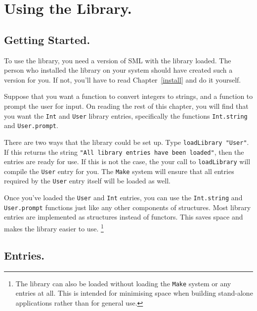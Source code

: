 %
%
%

\chapter{Using the Library.}	\label{user}

\section{Getting Started.}

To use the library, you need a version of SML with the library loaded.
The person who installed the library on your system should have created
such a version for you.  If not, you'll have to read Chapter~\ref{install}
and do it yourself.

Suppose that you want a function to convert integers to strings,
and a function to prompt the user for input.  On reading the rest of this
chapter, you will find that you want the {\tt Int} and {\tt User} library
entries, specifically the functions {\tt Int.string} and
{\tt User.prompt}.

There are two ways that the library could be set up.
Type {\tt loadLibrary "User"}.  If this returns the
string {\tt "All library entries have been loaded"},
then the entries are ready for use.  If this is not the case, the
your call to {\tt loadLibrary} will compile the {\tt User} entry for you.
The {\tt Make} system will ensure that all entries required by the
{\tt User} entry itself will be loaded as well.

Once you've loaded the {\tt User} and {\tt Int} entries, you can use
the {\tt Int.string} and {\tt User.prompt} functions just like any
other components of structures.  Most library entries are implemented
as structures instead of functors. This saves space and makes the
library easier to use.
\footnote{The library can also be loaded without loading the {\tt Make}
system or any entries at all.  This is intended for minimising space
when building stand-alone applications rather than for general use.}


\section{Entries.}

